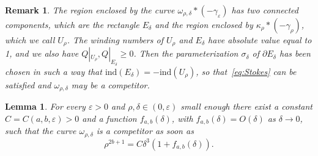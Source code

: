 \documentclass[10pt,a4paper]{amsart}
\newcommand{\ind}{{\mathrm{ind}}}
\newtheorem{lemma}{Lemma}
\newtheorem{remark}{Remark}
\renewcommand{\d}{\partial}
\newcommand{\de}{\delta}
\newcommand{\e}{\varepsilon}
\newcommand{\g}{\gamma}
\renewcommand{\k}{\kappa}
\newcommand{\s}{\sigma}
\newcommand{\w}{\omega}
\begin{document}
\begin{remark}
	\label{rem:win_num}
	The region enclosed by the curve $\w_{\rho,\de}*(-\g_\e)$ has two connected components, which are the rectangle $E_\de$ and the region enclosed by $\k_\rho * (-\g_\rho)$, which we call $U_{\rho}$. The winding numbers of $U_\rho$ and $E_\de$ have absolute value equal to 1, and we also have $Q|_{U_\rho}, Q|_{E_\de}\geq0$. Then the parameterization $\s_\de$ of $\d E_\de$ has been chosen in such a way that $\ind(E_\de)=-\ind(U_\rho)$, so that~\eqref{eq:Stokes} can be satisfied and $\w_{\rho,\de}$ may be a competitor.
\end{remark}

\begin{lemma}
	\label{lem:correction}
	For every $\e>0$ and $\rho,\de\in(0,\e)$ small enough there exist a constant $C=C(a,b,\e)>0$ and a function $f_{a,b}(\de)$, with $f_{a,b}(\de)=O(\de)$ as $\de\to0$, such that the curve $\w_{\rho,\de}$ is a competitor as soon as
	\begin{equation}
		\label{eq:correction}
		\rho^{2b+1}=C\de^3(1+f_{a,b}(\de)).
	\end{equation}
\end{lemma}
\end{document}
